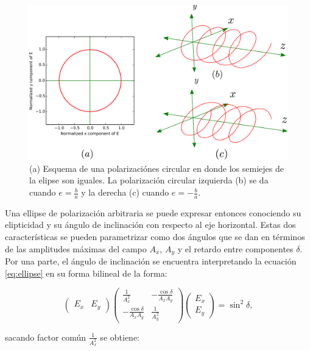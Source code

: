 \begin{figure}
\centering
\includegraphics[scale=.5]{circular_polarizations}
\caption[Estados de polarización circular]{(a) Esquema de una polarizaciónes circular en donde los semiejes
  de la elipse son iguales. La polarización circular izquierda (b) se da
cuando $e=\frac{b}{a}$ y la derecha (c) cuando  $e=-\frac{b}{a}$.}
\label{fig:circular_polarizations}
\end{figure}

Una ellipse de polarización arbitraria se puede expresar entonces conociendo su
elipticidad y su ángulo de inclinación con respecto al eje
horizontal. Estas dos características se pueden parametrizar como dos
ángulos que se dan en
términos de las amplitudes máximas del campo $A_x$, $A_y$
y el retardo entre componentes $\delta$. Por una parte, el ángulo de
inclinación se encuentra interpretando la ecuación \ref{eq:ellipse} en
su forma bilineal de la forma:

\begin{equation}
\begin{pmatrix}
E_x & E_y
\end{pmatrix}
\begin{pmatrix}
\frac{1}{A_x^2} & -\frac{\cos{\delta}}{A_xA_y}\\
 -\frac{\cos{\delta}}{A_xA_y} & \frac{1}{A_y^2} 
\end{pmatrix}
\begin{pmatrix}
E_x \\ E_y
\end{pmatrix}
=\sin^2{\delta},
\end{equation}

sacando factor común $\frac{1}{A_x^2} $ se obtiene:

